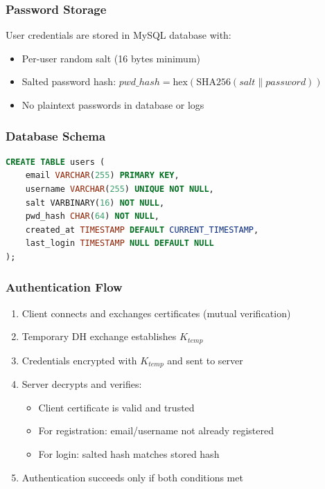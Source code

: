 \documentclass[runningheads]{llncs}
\begin{document}
\subsubsection{Password Storage}

User credentials are stored in MySQL database with:
\begin{itemize}
    \item Per-user random salt (16 bytes minimum)
    \item Salted password hash: $pwd\_hash = \text{hex}(\text{SHA256}(salt \| password))$
    \item No plaintext passwords in database or logs
\end{itemize}

\subsubsection{Database Schema}

\begin{lstlisting}[language=sql]
CREATE TABLE users (
    email VARCHAR(255) PRIMARY KEY,
    username VARCHAR(255) UNIQUE NOT NULL,
    salt VARBINARY(16) NOT NULL,
    pwd_hash CHAR(64) NOT NULL,
    created_at TIMESTAMP DEFAULT CURRENT_TIMESTAMP,
    last_login TIMESTAMP NULL DEFAULT NULL
);
\end{lstlisting}

\subsubsection{Authentication Flow}

\begin{enumerate}
    \item Client connects and exchanges certificates (mutual verification)
    \item Temporary DH exchange establishes $K_{temp}$
    \item Credentials encrypted with $K_{temp}$ and sent to server
    \item Server decrypts and verifies:
    \begin{itemize}
        \item Client certificate is valid and trusted
        \item For registration: email/username not already registered
        \item For login: salted hash matches stored hash
    \end{itemize}
    \item Authentication succeeds only if both conditions met
\end{enumerate}
\end{document}
